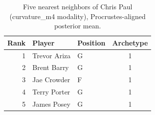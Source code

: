 \begin{table}[htbp]
  \centering\small
  \begin{tabular}{rllc}
    \toprule
    Rank & Player & Position & Archetype \\
    \midrule
    1 & Trevor Ariza & G & 1 \\
    2 & Brent Barry & G & 1 \\
    3 & Jae Crowder & F & 1 \\
    4 & Terry Porter & G & 1 \\
    5 & James Posey & G & 1 \\
    \bottomrule
  \end{tabular}
  \caption{Five nearest neighbors of Chris Paul (curvature_m4 modality), Procrustes-aligned posterior mean.}
  \label{tab:Chris_Paul_neighbors_curvature_m4}
\end{table}

